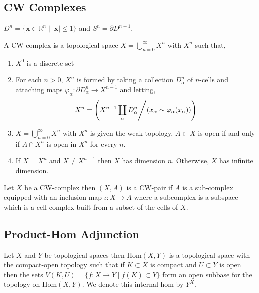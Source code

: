 \documentclass[12pt]{extarticle}
\newcommand{\R}{\mathbb{R}}
\newcommand{\Hom}[2]{\mathrm{Hom}\left( #1, #2 \right)}
\theoremstyle{definition}
\newenvironment{definition}[1][Definition:]{\begin{trivlist}
\item[\hskip \labelsep {\bfseries #1}]}{\end{trivlist}}
\begin{document}
\subsection{CW Complexes}

\begin{definition}
$D^n = \{ \mathbf{x} \in \R^n \mid |\mathbf{x}| \le 1 \}$ and $S^n = \partial D^{n + 1}$. 
\end{definition}

\begin{definition}
A CW complex is a topological space $X = \bigcup\limits_{n = 0}^{\infty} X^n$ with $X^n$ such that,
\begin{enumerate}
\item $X^0$ is a discrete set
\item For each $n > 0$, $X^n$ is formed by taking a collection $D_\alpha^n$ of $n$-cells and attaching maps $\varphi_\alpha : \partial D_{\alpha}^n \to X^{n - 1}$ and letting,
\[X^n = \left( X^{n - 1} \coprod\limits_{\alpha} D_\alpha^n \middle/  (x_\alpha \sim \varphi_\alpha(x_\alpha)) \right) \] 
\item $X = \bigcup\limits_{n = 0}^{\infty} X^n$ with $X^n$ is given the weak topology, $A \subset X$ is open if and only if $A \cap X^n$ is open in $X^n$ for every $n$.
\item If $X = X^n$ and $X \neq X^{n-1}$ then $X$ has dimension $n$. Otherwise, $X$ has infinite dimension. 
\end{enumerate}
\end{definition}

\begin{definition}
Let $X$ be a CW-complex then $(X, A)$ is a CW-pair if $A$ is a sub-complex equipped with an inclusion map $\iota : X \to A$ where a subcomplex is a subspace which is a cell-complex built from a subset of the cells of $X$. 
\end{definition}

\subsection{Product-Hom Adjunction}


\begin{definition}
Let $X$ and $Y$ be topological spaces then $\Hom{X}{Y}$ is a topological space with the compact-open topology such that if $K \subset X$ is compact and $U \subset Y$ is open then the sets $V(K, U) = \{ f : X \to Y \mid f(K) \subset Y \}$ form an open subbase for the topology on $\Hom{X}{Y}$. We denote this internal hom by $Y^X$. 
\end{definition}
\end{document}
